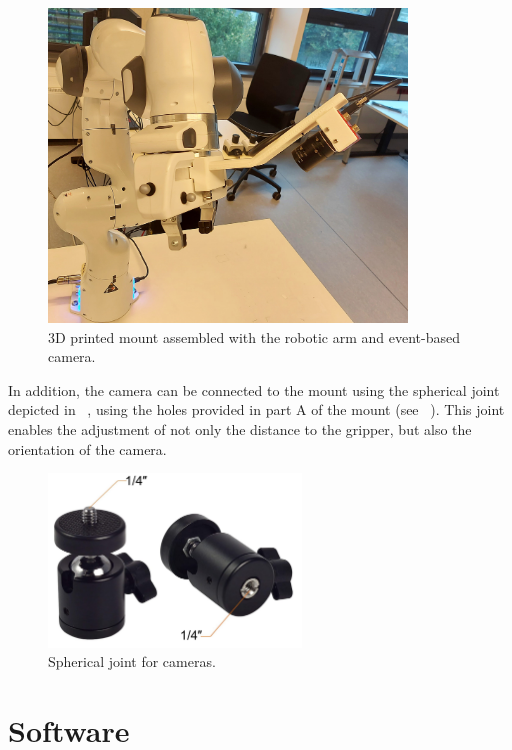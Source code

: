 \begin{figure}[H]
    \centering
    \includegraphics[width=0.85\textwidth]{resources/images/assembly_real}
    \caption{3D printed mount assembled with the robotic arm and event-based camera.}\label{fig:assembly_real}
\end{figure}

In addition, the camera can be connected to the mount using the spherical joint depicted in ~, using the holes provided in part A of the mount (see ~). This joint enables the adjustment of not only the distance to the gripper, but also the orientation of the camera.

\begin{figure}[H]
    \centering
    \includegraphics[width=0.6\textwidth]{resources/images/sphericaljoint}
    \caption{Spherical joint for cameras.}\label{fig:spherical}
\end{figure}

\section{Software}

